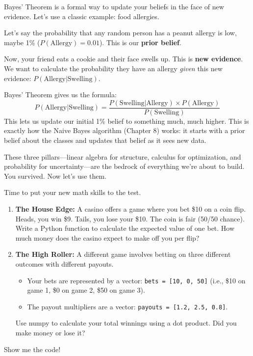 \documentclass[11pt, letterpaper, openany]{book}
\begin{document}
Bayes' Theorem is a formal way to update your beliefs in the face of new evidence. Let's use a classic example: food allergies.

Let's say the probability that any random person has a peanut allergy is low, maybe 1\% ($P(\text{Allergy}) = 0.01$). This is our \textbf{prior belief}.

Now, your friend eats a cookie and their face swells up. This is \textbf{new evidence}. We want to calculate the probability they have an allergy \emph{given} this new evidence: $P(\text{Allergy} | \text{Swelling})$.

Bayes' Theorem gives us the formula:
\[ P(\text{Allergy} | \text{Swelling}) = \frac{P(\text{Swelling} | \text{Allergy}) \times P(\text{Allergy})}{P(\text{Swelling})} \]
This lets us update our initial 1\% belief to something much, much higher. This is exactly how the Naive Bayes algorithm (Chapter 8) works: it starts with a prior belief about the classes and updates that belief as it sees new data.

These three pillars—linear algebra for structure, calculus for optimization, and probability for uncertainty—are the bedrock of everything we're about to build. You survived. Now let's use them.

\begin{challengebox}
Time to put your new math skills to the test.
\begin{enumerate}
    \item \textbf{The House Edge:} A casino offers a game where you bet \$10 on a coin flip. Heads, you win \$9. Tails, you lose your \$10. The coin is fair (50/50 chance). Write a Python function to calculate the expected value of one bet. How much money does the casino expect to make off you per flip?
    \item \textbf{The High Roller:} A different game involves betting on three different outcomes with different payouts.
    \begin{itemize}
        \item Your bets are represented by a vector: \texttt{bets = [10, 0, 50]} (i.e., \$10 on game 1, \$0 on game 2, \$50 on game 3).
        \item The payout multipliers are a vector: \texttt{payouts = [1.2, 2.5, 0.8]}.
    \end{itemize}
    Use numpy to calculate your total winnings using a dot product. Did you make money or lose it?
\end{enumerate}
Show me the code!
\end{challengebox}
\end{document}
